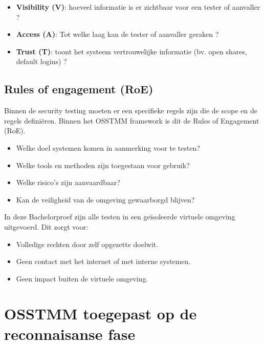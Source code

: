 \begin{itemize}
    \item \textbf{Visibility (V)}: hoeveel informatie is er zichtbaar voor een tester of aanvaller ?
    \item \textbf{Access (A)}: Tot welke laag kan de tester of aanvaller geraken ?
    \item \textbf{Trust (T)}: toont het systeem vertrouwelijke informatie (bv. open shares, default logins) ?
\end{itemize}


\subsection{Rules of engagement (RoE)}

Binnen de security testing moeten er een specifieke regels zijn die de scope en de regels definiëren. Binnen het OSSTMM framework is dit de Rules of Engagement (RoE).

\begin{itemize}
  \item Welke doel systemen komen in aanmerking voor te testen?
  \item Welke tools en methoden zijn toegestaan voor gebruik?
  \item Welke risico's zijn aanvaardbaar? 
  \item Kan de veiligheid van de omgeving gewaarborgd blijven?
\end{itemize}

In deze Bachelorproef zijn alle testen in een geïsoleerde virtuele omgeving uitgevoerd. Dit zorgt voor:

\begin{itemize}
  \item Volledige rechten door zelf opgezette doelwit.
  \item Geen contact met het internet of met interne systemen.
  \item Geen impact buiten de virtuele omgeving.
\end{itemize}

\section{OSSTMM toegepast op de reconnaisanse fase}

